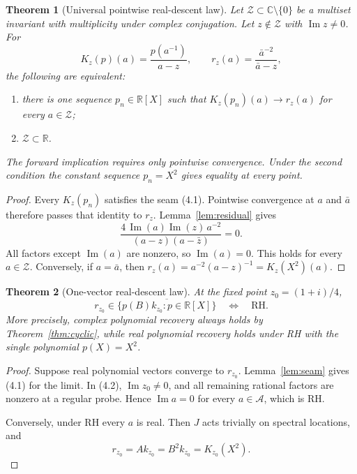 \documentclass[11pt]{article}
\newtheorem{theorem}{Theorem}[section]
\theoremstyle{definition}
\theoremstyle{remark}
\newcommand{\C}{\mathbb C}
\newcommand{\R}{\mathbb R}
\newcommand{\cA}{\mathcal A}
\newcommand{\Ima}{\operatorname{Im}}
\begin{document}
\begin{theorem}[Universal pointwise real-descent law]
\label{thm:universaldescent}
Let $\mathcal Z\subset\C\setminus\{0\}$ be a multiset invariant with multiplicity under complex
conjugation.  Let $z\notin\mathcal Z$ with $\Ima z\ne0$.  For
\[
 K_z(p)(a)=\frac{p(a^{-1})}{a-z},
 \qquad
 r_z(a)=\frac{\bar a^{-2}}{\bar a-z},
\]
the following are equivalent:
\begin{enumerate}
 \item there is one sequence $p_n\in\R[X]$ such that
       $K_z(p_n)(a)\to r_z(a)$ for every $a\in\mathcal Z$;
 \item $\mathcal Z\subset\R$.
\end{enumerate}
The forward implication requires only pointwise convergence.  Under the second condition the
constant sequence $p_n=X^2$ gives equality at every point.
\end{theorem}

\begin{proof}
Every $K_z(p_n)$ satisfies the seam (4.1).  Pointwise convergence at $a$ and $\bar a$ therefore
passes that identity to $r_z$.  Lemma~\ref{lem:residual} gives
\[
 \frac{4\,\Ima(a)\Ima(z)\,a^{-2}}
 {(a-z)(a-\bar z)}=0.
\]
All factors except $\Ima(a)$ are nonzero, so $\Ima(a)=0$.  This holds for every
$a\in\mathcal Z$.  Conversely, if $a=\bar a$, then
$r_z(a)=a^{-2}(a-z)^{-1}=K_z(X^2)(a)$.
\end{proof}

\begin{theorem}[One-vector real-descent law]
\label{thm:realdescent}
At the fixed point $z_0=(1+i)/4$,
\begin{equation}
 \boxed{\quad
 r_{z_0}\in\overline{\{p(B)k_{z_0}:p\in\R[X]\}}
 \quad\Longleftrightarrow\quad\mathrm{RH}.
 \quad}                                                   \tag{4.3}
\end{equation}
More precisely, complex polynomial recovery always holds by
Theorem~\ref{thm:cyclic}, while real polynomial recovery holds under RH with the single polynomial
$p(X)=X^2$.
\end{theorem}

\begin{proof}
Suppose real polynomial vectors converge to $r_{z_0}$.  Lemma~\ref{lem:seam} gives (4.1) for the
limit.  In (4.2), $\Ima z_0\ne0$, and all remaining rational factors are nonzero at a regular
probe.  Hence $\Ima a=0$ for every $a\in\cA$, which is RH.

Conversely, under RH every $a$ is real.  Then $J$ acts trivially on spectral locations, and
\[
 r_{z_0}=Ak_{z_0}=B^2k_{z_0}=K_{z_0}(X^2).
\]
\end{proof}
\end{document}
